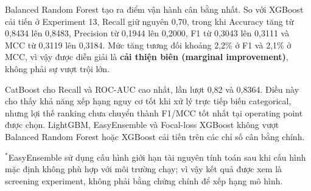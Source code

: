 \begin{table}[H]
\centering
\scriptsize
\caption{Dataset 1: kết quả các phương pháp mở rộng trên cùng outer test}
\label{tab:d1_new_methods}
\end{table}

Balanced Random Forest tạo ra điểm vận hành cân bằng nhất. So với XGBoost cải tiến ở Experiment 13, Recall giữ nguyên 0,70, trong khi Accuracy tăng từ 0,8434 lên 0,8483, Precision từ 0,1944 lên 0,2000, F1 từ 0,3043 lên 0,3111 và MCC từ 0,3119 lên 0,3184. Mức tăng tương đối khoảng 2,2\% ở F1 và 2,1\% ở MCC, vì vậy được diễn giải là \textbf{cải thiện biên (marginal improvement)}, không phải sự vượt trội lớn.

CatBoost cho Recall và ROC-AUC cao nhất, lần lượt 0,82 và 0,8364. Điều này cho thấy khả năng xếp hạng nguy cơ tốt khi xử lý trực tiếp biến categorical, nhưng lợi thế ranking chưa chuyển thành F1/MCC tốt nhất tại operating point được chọn. LightGBM, EasyEnsemble và Focal-loss XGBoost không vượt Balanced Random Forest hoặc XGBoost cải tiến trên các chỉ số cân bằng chính.

$^{*}$EasyEnsemble sử dụng cấu hình giới hạn tài nguyên tính toán sau khi cấu hình mặc định không phù hợp với môi trường chạy; vì vậy kết quả được xem là screening experiment, không phải bằng chứng chính để xếp hạng mô hình.

